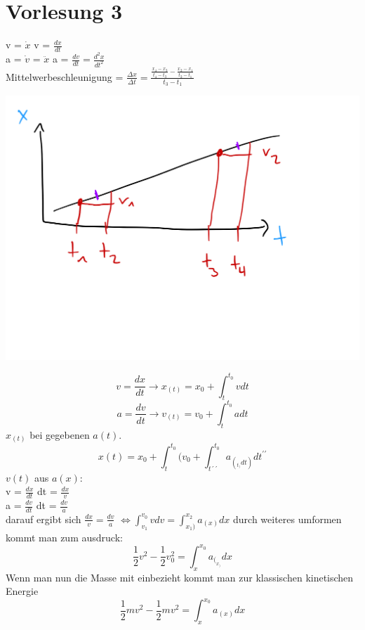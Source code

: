 \documentclass[11pt]{article}
\begin{document}
	\part{Vorlesung 3}
	v = $\dot{x}$ \qquad v = $\frac{dx}{dt}$ \\
	a = $\dot{v}$ = $\ddot{x}$ \qquad  a = $\frac{dv}{dt} = \frac{d^2x}{dt^2}$ \\
	Mittelwerbeschleunigung = $\frac{\Delta x}{\Delta t} = \frac{\frac{x_4 - x_3}{t_4 - t_3} - \frac{x_2 - x_1}{t_2 - t_1}}{t_3 - t_1}$
	\begin{center}
		\includegraphics[scale=0.3]{IMG_EFF187166B54-1.jpeg}
	\end{center}
	\[ v = \frac{dx}{dt} \rightarrow x_(t) = x_0 + \int_{t}^{t_0} v dt \]
	\[ a = \frac{dv}{dt} \rightarrow v_(t)  = v_0 + \int_{t}^{t_0} a dt \]
	$x_(t)$ bei gegebenen $a(t)$. \\
	\[ x(t) = x_0 + \int_{t}^{t_0} (v_0 + \int_{t´´}^{t_0} a_(_t_) dt) dt^{\prime \prime} \]
	$v(t)$ aus $a(x)$: \\
	v = $\frac{dx}{dt}$ \qquad dt = $\frac{dx}{v}$ \\
	a = $\frac{dv}{dt} $ \qquad dt = $\frac{dv}{a}$\\
	darauf ergibt sich $\frac{dx}{v} = \frac{dv}{a}$ $\Leftrightarrow \int_{v_1}^{v_0} v dv = \int_{x_1)}^{x_2} a_(x)dx$ durch weiteres umformen kommt man zum ausdruck: \\
	\[ \frac{1}{2} v^2 -\frac{1}{2} v_0^2 = \int_{x}^{x_0} a_(_x_)dx \]
	Wenn man nun die Masse mit einbezieht kommt man zur klassischen kinetischen Energie\\
	\[ \frac{1}{2} mv^2 - \frac{1}{2} mv^2 = \int_{x}^{x_0} a_(x) dx \]
	
\end{document}
